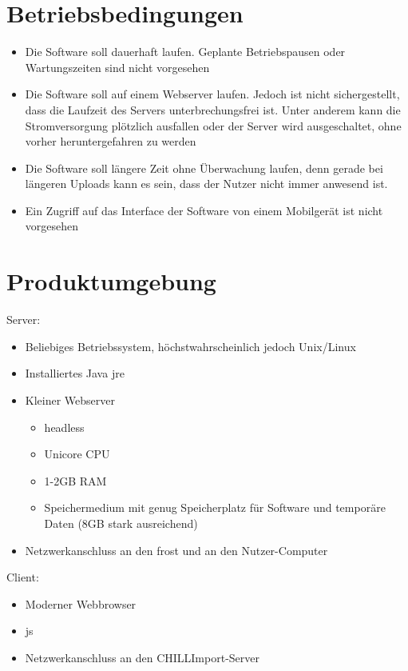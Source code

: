 \documentclass[a4paper, 12 pt]{article}
\begin{document}
\section{Betriebsbedingungen}
\begin{itemize}
	\item Die Software soll dauerhaft laufen. Geplante Betriebspausen oder Wartungszeiten sind nicht vorgesehen
	\item Die Software soll auf einem Webserver laufen. Jedoch ist nicht sichergestellt, dass die Laufzeit des Servers unterbrechungsfrei ist. Unter anderem kann die Stromversorgung plötzlich ausfallen oder der Server wird ausgeschaltet, ohne vorher heruntergefahren zu werden
	\item Die Software soll längere Zeit ohne Überwachung laufen, denn gerade bei längeren Uploads kann es sein, dass der Nutzer nicht immer anwesend ist.
	\item Ein Zugriff auf das Interface der Software von einem Mobilgerät ist nicht vorgesehen
\end{itemize}
	
\section{Produktumgebung}
Server:
\begin{itemize}
	\item Beliebiges Betriebssystem, höchstwahrscheinlich jedoch Unix/Linux
	\item Installiertes Java \gls{jre}
	\item Kleiner Webserver
	\begin{itemize}
		\item \gls{headless}
		\item Unicore CPU
		\item 1-2GB RAM
		\item Speichermedium mit genug Speicherplatz für Software und temporäre Daten (8GB stark ausreichend)
	\end{itemize}
	\item Netzwerkanschluss an den \gls{frost} und an den Nutzer-Computer
\end{itemize}

\noindent Client:

\begin{itemize}
	\item Moderner Webbrowser
	\item \gls{js}
	\item Netzwerkanschluss an den CHILLImport-Server
\end{itemize}
	
\end{document}
